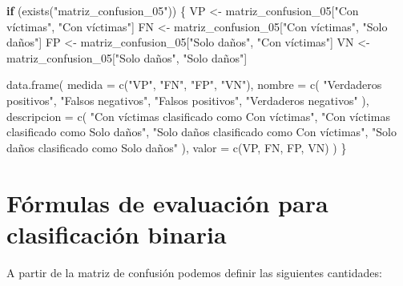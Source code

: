 \documentclass[
  11pt,
  letterpaper,
]{book}
\newenvironment{Shaded}{\begin{snugshade}}{\end{snugshade}}
\newcommand{\AttributeTok}[1]{\textcolor[rgb]{0.40,0.45,0.13}{#1}}
\newcommand{\ControlFlowTok}[1]{\textcolor[rgb]{0.00,0.23,0.31}{\textbf{#1}}}
\newcommand{\FunctionTok}[1]{\textcolor[rgb]{0.28,0.35,0.67}{#1}}
\newcommand{\NormalTok}[1]{\textcolor[rgb]{0.00,0.23,0.31}{#1}}
\newcommand{\OtherTok}[1]{\textcolor[rgb]{0.00,0.23,0.31}{#1}}
\newcommand{\StringTok}[1]{\textcolor[rgb]{0.13,0.47,0.30}{#1}}
\begin{document}
\begin{Shaded}
\begin{Highlighting}[]
\ControlFlowTok{if}\NormalTok{ (}\FunctionTok{exists}\NormalTok{(}\StringTok{"matriz\_confusion\_05"}\NormalTok{)) \{}
\NormalTok{  VP }\OtherTok{\textless{}{-}}\NormalTok{ matriz\_confusion\_05[}\StringTok{"Con víctimas"}\NormalTok{, }\StringTok{"Con víctimas"}\NormalTok{]}
\NormalTok{  FN }\OtherTok{\textless{}{-}}\NormalTok{ matriz\_confusion\_05[}\StringTok{"Con víctimas"}\NormalTok{, }\StringTok{"Solo daños"}\NormalTok{]}
\NormalTok{  FP }\OtherTok{\textless{}{-}}\NormalTok{ matriz\_confusion\_05[}\StringTok{"Solo daños"}\NormalTok{, }\StringTok{"Con víctimas"}\NormalTok{]}
\NormalTok{  VN }\OtherTok{\textless{}{-}}\NormalTok{ matriz\_confusion\_05[}\StringTok{"Solo daños"}\NormalTok{, }\StringTok{"Solo daños"}\NormalTok{]}

  \FunctionTok{data.frame}\NormalTok{(}
    \AttributeTok{medida =} \FunctionTok{c}\NormalTok{(}\StringTok{"VP"}\NormalTok{, }\StringTok{"FN"}\NormalTok{, }\StringTok{"FP"}\NormalTok{, }\StringTok{"VN"}\NormalTok{),}
    \AttributeTok{nombre =} \FunctionTok{c}\NormalTok{(}
      \StringTok{"Verdaderos positivos"}\NormalTok{,}
      \StringTok{"Falsos negativos"}\NormalTok{,}
      \StringTok{"Falsos positivos"}\NormalTok{,}
      \StringTok{"Verdaderos negativos"}
\NormalTok{    ),}
    \AttributeTok{descripcion =} \FunctionTok{c}\NormalTok{(}
      \StringTok{"Con víctimas clasificado como Con víctimas"}\NormalTok{,}
      \StringTok{"Con víctimas clasificado como Solo daños"}\NormalTok{,}
      \StringTok{"Solo daños clasificado como Con víctimas"}\NormalTok{,}
      \StringTok{"Solo daños clasificado como Solo daños"}
\NormalTok{    ),}
    \AttributeTok{valor =} \FunctionTok{c}\NormalTok{(VP, FN, FP, VN)}
\NormalTok{  )}
\NormalTok{\}}
\end{Highlighting}
\end{Shaded}

\section{Fórmulas de evaluación para clasificación
binaria}\label{fuxf3rmulas-de-evaluaciuxf3n-para-clasificaciuxf3n-binaria}

A partir de la matriz de confusión podemos definir las siguientes
cantidades:
\end{document}
